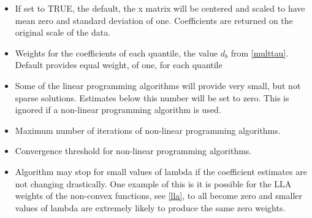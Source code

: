 \documentclass[article]{rqPenVignette}%
\begin{document}
\begin{itemize}
\item[\code{scalex}] If set to TRUE, the default, the x matrix will be centered and scaled to have mean zero and standard deviation of one. Coefficients are returned on the original scale of the data. 
\item[\code{tau.penalty.factor}] Weights for the coefficients of each quantile, the value $d_b$ from \eqref{multtau}. Default provides equal weight, of one, for each quantile 
\item[\code{coef.cutoff}] Some of the linear programming algorithms will provide very small, but not sparse solutions. Estimates below this number will be set to zero. This is ignored if a non-linear programming algorithm is used.
\item[\code{max.iter}] Maximum number of iterations of non-linear programming algorithms.
\item[\code{converge.eps}] Convergence threshold for non-linear programming algorithms.
\item[\code{lambda.discard}] Algorithm may stop for small values of lambda if the coefficient estimates are not changing drastically. One example of this is it is possible for the LLA weights of the non-convex functions, see \eqref{lla},  to all become zero and smaller values of lambda are extremely likely to produce the same zero weights.
\end{itemize}
\end{document}
